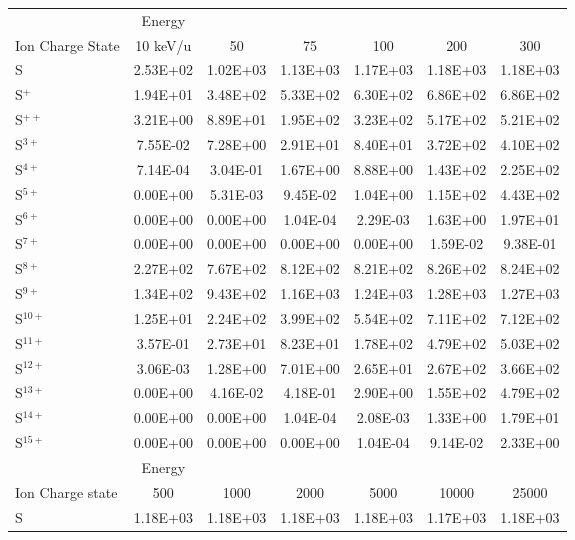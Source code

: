 \begin{table}
    \centering
    \begin{tabular}{l|c|c|c|c|c|c}
    \hline
    & Energy & & & & & \\
    Ion Charge State & 10 keV/u & 50 & 75 & 100 & 200 & 300 \\
    \hline
    S & 2.53E+02 & 1.02E+03 & 1.13E+03 & 1.17E+03 & 1.18E+03 & 1.18E+03 \\
    S$^+$ & 1.94E+01 & 3.48E+02 & 5.33E+02 & 6.30E+02 & 6.86E+02 & 6.86E+02 \\
    S$^{++}$ & 3.21E+00 & 8.89E+01 & 1.95E+02 & 3.23E+02 & 5.17E+02 & 5.21E+02 \\
    S$^{3+}$ & 7.55E-02 & 7.28E+00 & 2.91E+01 & 8.40E+01 & 3.72E+02 & 4.10E+02 \\
    S$^{4+}$ & 7.14E-04 & 3.04E-01 & 1.67E+00 & 8.88E+00 & 1.43E+02 & 2.25E+02 \\
    S$^{5+}$ & 0.00E+00 & 5.31E-03 & 9.45E-02 & 1.04E+00 & 1.15E+02 & 4.43E+02 \\
    S$^{6+}$ & 0.00E+00 & 0.00E+00 & 1.04E-04 & 2.29E-03 & 1.63E+00 & 1.97E+01 \\
    S$^{7+}$ & 0.00E+00 & 0.00E+00 & 0.00E+00 & 0.00E+00 & 1.59E-02 & 9.38E-01 \\
    S$^{8+}$ & 2.27E+02 & 7.67E+02 & 8.12E+02 & 8.21E+02 & 8.26E+02 & 8.24E+02 \\
    S$^{9+}$ & 1.34E+02 & 9.43E+02 & 1.16E+03 & 1.24E+03 & 1.28E+03 & 1.27E+03 \\
    S$^{10+}$ & 1.25E+01 & 2.24E+02 & 3.99E+02 & 5.54E+02 & 7.11E+02 & 7.12E+02 \\
    S$^{11+}$ & 3.57E-01 & 2.73E+01 & 8.23E+01 & 1.78E+02 & 4.79E+02 & 5.03E+02 \\
    S$^{12+}$ & 3.06E-03 & 1.28E+00 & 7.01E+00 & 2.65E+01 & 2.67E+02 & 3.66E+02 \\
    S$^{13+}$ & 0.00E+00 & 4.16E-02 & 4.18E-01 & 2.90E+00 & 1.55E+02 & 4.79E+02 \\
    S$^{14+}$ & 0.00E+00 & 0.00E+00 & 1.04E-04 & 2.08E-03 & 1.33E+00 & 1.79E+01 \\
    S$^{15+}$ & 0.00E+00 & 0.00E+00 & 0.00E+00 & 1.04E-04 & 9.14E-02 & 2.33E+00 \\
    \hline
    \hline
    & Energy & & & & & \\
    Ion Charge state & 500 & 1000 & 2000 & 5000 & 10000 & 25000 \\
    \hline
    S & 1.18E+03 & 1.18E+03 & 1.18E+03 & 1.18E+03 & 1.17E+03 & 1.18E+03 \\

\end{tabular}
\end{table}
